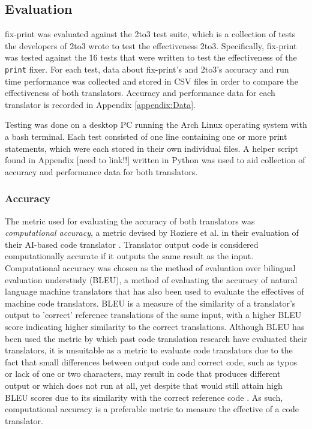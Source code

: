 \subsection{Evaluation}
fix-print was evaluated against the 2to3 test suite, which is a collection of tests the developers of 2to3 wrote to test the effectiveness 2to3. Specifically, fix-print was tested against the 16 tests that were written to test the effectiveness of the \verb|print| fixer. For each test, data about fix-print's and 2to3's accuracy and run time performance was collected and stored in CSV files in order to compare the effectiveness of both translators. Accuracy and performance data for each translator is recorded in Appendix \ref{appendix:Data}.

Testing was done on a desktop PC running the Arch Linux operating system with a bash terminal. Each test consisted of one line containing one or more print statements, which were each stored in their own individual files. A helper script found in Appendix [need to link!!] written in Python was used to aid collection of accuracy and performance data for both translators.

\subsubsection{Accuracy}
The metric used for evaluating the accuracy of both translators was \textit{computational accuracy}, a metric devised by Roziere et al. in their evaluation of their AI-based code translator \autocite{Roziere}. Translator output code is considered computationally accurate if it outputs the same result as the input. Computational accuracy was chosen as the method of evaluation over bilingual evaluation understudy (BLEU), a method of evaluating the accuracy of natural language machine translators that has also been used to evaluate the effectives of machine code translators. BLEU is a measure of the similarity of a translator's output to 'correct' reference translations of the same input, with a higher BLEU score indicating higher similarity to the correct translations. Although BLEU has been used the metric by which past code translation research have evaluated their translators, it is unsuitable as a metric to evaluate code translators due to the fact that small differences between output code and correct code, such as typos or lack of one or two characters, may result in code that produces different output or which does not run at all, yet despite that would still attain high BLEU scores due to its similarity with the correct reference code \autocite{Roziere}. As such, computational accuracy is a preferable metric to measure the effective of a code translator.

